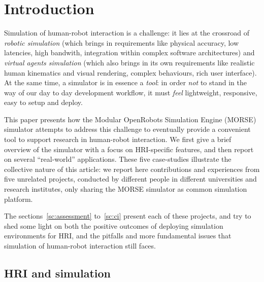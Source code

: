 \documentclass[conference]{IEEEtran}
\begin{document}
\IEEEpeerreviewmaketitle

\section{Introduction}

Simulation of human-robot interaction is a challenge: it lies at the crossroad
of \emph{robotic simulation} (which brings in requirements like physical
accuracy, low latencies, high bandwith, integration within complex software
architectures) and \emph{virtual agents simulation} (which also brings in its
own requirements like realistic human kinematics and visual rendering, complex
behaviours, rich user interface).  At the same time, a simulator is in essence a
\emph{tool}: in order \emph{not} to stand in the way of our day to day
development workflow, it must \emph{feel} lightweight, responsive, easy to setup
and deploy.

This paper presents how the Modular OpenRobots Simulation Engine
(MORSE)~\cite{Echeverria2011, morse_simpar_2012} simulator attempts to address
this challenge to eventually provide a convenient tool to support research in
human-robot interaction. We first give a brief overview of the simulator with a
focus on HRI-specific features, and then report on several ``real-world''
applications.  These five case-studies illustrate the collective nature of this
article: we report here contributions and experiences from five unrelated
projects, conducted by different people in different universities and research
institutes, only sharing the MORSE simulator as common simulation platform.

The sections~\ref{sc:assessment} to~\ref{sc:ci} present each of these projects,
and try to shed some light on both the positive outcomes of deploying simulation
environments for HRI, and the pitfalls and more fundamental issues that
simulation of human-robot interaction still faces.

\subsection*{HRI and simulation}
\end{document}
